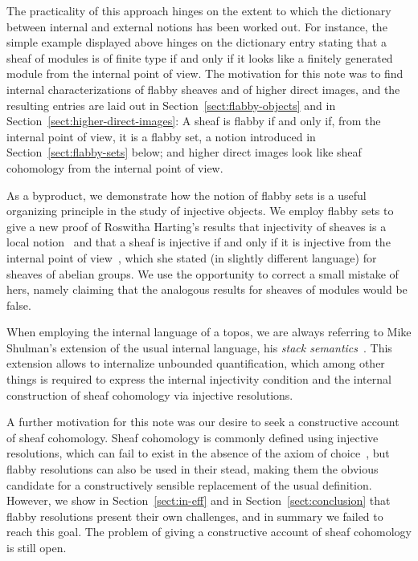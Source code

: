 \documentclass[oneside]{amsart}
\theoremstyle{definition}
\theoremstyle{plain}
\theoremstyle{remark}
\renewcommand{\_}{\mathpunct{.}\,}
\begin{document}
The practicality of this approach hinges on the extent to which the dictionary
between internal and external notions has been worked out. For instance, the
simple example displayed above hinges on the dictionary entry stating that a
sheaf of modules is of finite type if and only if it looks like a
finitely generated module from the internal point of view. The motivation for
this note was to find internal characterizations of flabby sheaves and of higher
direct images, and the resulting entries are laid out in
Section~\ref{sect:flabby-objects} and in
Section~\ref{sect:higher-direct-images}: A sheaf is flabby if and only if, from
the internal point of view, it is a flabby set, a notion introduced in
Section~\ref{sect:flabby-sets} below; and higher direct images look like sheaf
cohomology from the internal point of view.

As a byproduct, we demonstrate how the notion of flabby sets is a useful
organizing principle in the study of injective objects. We employ flabby sets
to give a new proof of Roswitha Harting's results that injectivity of sheaves is
a local notion~\cite{harting:remark} and that a sheaf is injective if and only
if it is injective from the internal point of
view~\cite{harting:locally-injective}, which she stated (in slightly different
language) for sheaves of abelian groups. We use the opportunity to correct a
small mistake of hers, namely claiming that the analogous results for sheaves of
modules would be false.

When employing the internal language of a topos, we are always referring to Mike Shulman's
extension of the usual internal language, his \emph{stack
semantics}~\cite{shulman:stack-semantics}. This extension allows to internalize
unbounded quantification, which among other things is required to express the
internal injectivity condition and the internal construction of sheaf
cohomology via injective resolutions.

A further motivation for this note was our desire to seek a constructive
account of sheaf cohomology. Sheaf cohomology is commonly defined using
injective resolutions, which can fail to exist in the absence of the axiom of
choice~\cite{blass:inj-proj-axc}, but flabby resolutions
can also be used in their stead, making them the obvious candidate for a
constructively sensible replacement of the usual definition. However, we show
in Section~\ref{sect:in-eff} and in Section~\ref{sect:conclusion} that flabby
resolutions present their own challenges, and in summary we failed to reach this
goal. The problem of giving a constructive account
of sheaf cohomology is still open.
\end{document}
